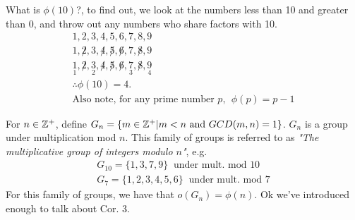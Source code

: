 \begin{example}
What is $\phi(10)$?, to find out, we look at the numbers less than 10 and greater than 0, and throw out any numbers who share factors with 10.
\begin{align}
1,2,3,4,5,6,7,8,9 \nonumber \\
1,\not 2, 3,\not 4, \not 5, \not 6,7,\not 8, 9 \nonumber \\
\underset{1}{1},\not 2, \underset{2}{3},\not 4, \not 5, \not 6,\underset{3}{7},\not 8, \underset{4}{9} \nonumber \\
\therefore \phi(10)=4. \nonumber \\
\text{Also note, for any prime number }p, \ \ \phi(p)=p-1 \nonumber
\end{align}
\end{example}

\begin{example}
For $n\in {\mathbb{ Z}}^+$, define $G_n=\{m\in {\mathbb{ Z}}^+ | m<n \text{ and } GCD(m,n)=1\}$. $G_n$ is a group under multiplication mod $n$. This family of groups is referred to as \textit{"The multiplicative group of integers modulo $n$"}, e.g. 
\begin{align}
    G_{10}= \{1,3,7,9\} \ \text{ under mult. mod }10 \nonumber \\
    G_{7}= \{1,2,3,4,5,6\} \ \text{ under mult. mod }7 \nonumber 
\end{align}
For this family of groups, we have that $o(G_n)=\phi(n)$. Ok we've introduced enough to talk about Cor. 3.
\end{example}

